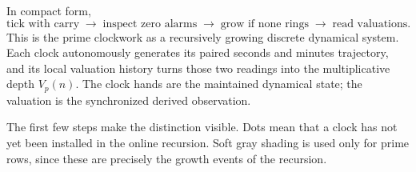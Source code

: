 \documentclass[11pt,a4paper]{article}
\theoremstyle{clockplain}
\theoremstyle{definition}
\theoremstyle{remark}
\begin{document}
In compact form,
\begin{equation}
\boxed{\text{tick with carry}\;\longrightarrow\;\text{inspect zero alarms}\;\longrightarrow\;\text{grow if none rings}\;\longrightarrow\;\text{read valuations}.}
\label{eq:recursive-install}
\end{equation}
This is the prime clockwork as a recursively growing discrete dynamical system. Each clock autonomously generates its paired seconds and minutes trajectory, and its local valuation history turns those two readings into the multiplicative depth $V_p(n)$. The clock hands are the maintained dynamical state; the valuation is the synchronized derived observation.

The first few steps make the distinction visible. Dots mean that a clock has not yet been installed in the online recursion. Soft gray shading is used only for prime rows, since these are precisely the growth events of the recursion.
\end{document}
